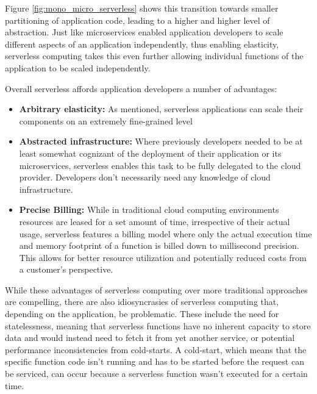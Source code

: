 Figure \ref{fig:mono_micro_serverless} shows this transition towards smaller partitioning of application code, leading to a higher and higher level of abstraction.
Just like microservices enabled application developers to scale different aspects of an application independently, thus enabling elasticity, serverless computing takes this even further allowing individual functions of the application to be scaled independently\cite{jonasCloudProgrammingSimplified2019}.

Overall serverless affords application developers a number of advantages:
\begin{itemize}
    \item \textbf{Arbitrary elasticity:} As mentioned, serverless applications can scale their components on an extremely fine-grained level\cite{khandelwalTaureauDeconstructingServerless2020}
    \item \textbf{Abstracted infrastructure:} Where previously developers needed to be at least somewhat cognizant of the deployment of their application or its microservices, serverless enables this task to be fully delegated to the cloud provider. Developers don't necessarily need any knowledge of cloud infrastructure\cite{jonasCloudProgrammingSimplified2019}.
    \item \textbf{Precise Billing:} While in traditional cloud computing environments resources are leased for a set amount of time, irrespective of their actual usage\cite{khandelwalTaureauDeconstructingServerless2020}, serverless features a billing model where only the actual execution time and memory footprint of a function is billed down to millisecond precision\cite{jonasCloudProgrammingSimplified2019}. This allows for better resource utilization and potentially reduced costs from a customer's perspective\cite{khandelwalTaureauDeconstructingServerless2020}.
\end{itemize}

While these advantages of serverless computing over more traditional approaches are compelling, there are also idiosyncrasies of serverless computing that, depending on the application, be problematic.
These include the need for statelessness, meaning that serverless functions have no inherent capacity to store data and would instead need to fetch it from yet another service\cite{khandelwalTaureauDeconstructingServerless2020}, or potential performance inconsistencies from cold-starts.
A cold-start, which means that the specific function code isn't running and has to be started before the request can be serviced, can occur because a serverless function wasn't executed for a certain time\cite{wangPeekingCurtainsServerless2018}.


